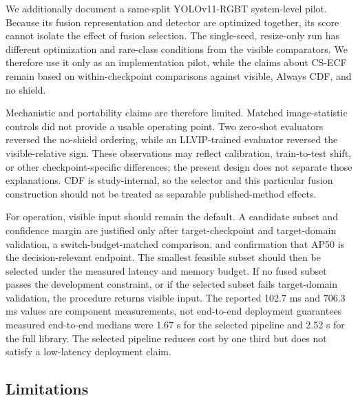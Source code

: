 \documentclass[preprint,11pt]{elsarticle}
\providecommand{\DIFaddtex}[1]{{\protect\color{blue} \sf #1}} %
\providecommand{\DIFdeltex}[1]{{\protect\color{red} \scriptsize #1}} %
\providecommand{\DIFaddbegin}{} %
\providecommand{\DIFaddend}{} %
\providecommand{\DIFdelbegin}{} %
\providecommand{\DIFdelend}{} %
\providecommand{\DIFadd}[1]{\texorpdfstring{\DIFaddtex{#1}}{#1}} %
\providecommand{\DIFdel}[1]{\texorpdfstring{\DIFdeltex{#1}}{}} %
\begin{document}
We additionally document a same-split YOLOv11-RGBT system-level pilot. Because
its fusion representation and detector are optimized together,
its score cannot isolate the effect of fusion selection. The single-seed,
resize-only run has different optimization and rare-class conditions from the
visible comparators. We therefore use it only as an implementation pilot,
while the claims about CS-ECF remain based on within-checkpoint comparisons
against visible, Always CDF, and no shield.

Mechanistic and portability claims are therefore limited. Matched
image-statistic controls did not provide a usable operating point. Two
zero-shot evaluators reversed the no-shield ordering, while an LLVIP-trained
evaluator reversed the visible-relative sign. These observations may reflect
calibration, train-to-test shift, or other checkpoint-specific differences;
the present design does not separate those explanations. CDF is study-internal,
so the selector and this particular fusion construction should not be treated
as separable published-method effects.

For operation, visible input should remain the default. A candidate subset and
confidence margin are justified only after target-checkpoint and
target-domain validation, a switch-budget-matched comparison, and confirmation
that AP50 is the decision-relevant endpoint. The smallest feasible subset
should then be selected under the measured latency and memory budget. If no
fused subset passes the development constraint, or if the selected subset
fails target-domain validation, the procedure returns visible input. The
\DIFdelbegin \DIFdel{reported 102.7 ms and 706.3 ms values are component measurements, not end-to-end deployment guarantees}\DIFdelend \DIFaddbegin \DIFadd{measured end-to-end medians were 1.67 s for the selected pipeline and 2.52 s
for the full library. The selected pipeline reduces cost by one third but does
not satisfy a low-latency deployment claim}\DIFaddend .

\subsection*{Limitations}
\end{document}
